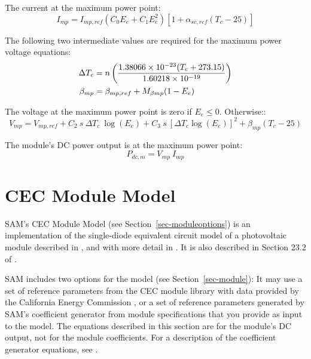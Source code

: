 \documentclass[12pt,letterpaper]{article}
\begin{document}
The current at the maximum power point:
\begin{equation}
I_{mp} = I_{mp,ref} (C_0 E_e + C_1 E_e^2) \left[1 + \alpha_{sc,ref} (T_c - 25)\right]
\end{equation}

The following two intermediate values are required for the maximum power voltage equations:
\begin{align}
\Delta T_c &= n \left(\frac{1.38066\times10^{-23} (T_c + 273.15)}{1.60218\times10^{-19}}\right) \notag\\
\beta_{mp} & = \beta_{mp,ref} + M_{\beta mp} (1 - E_e)
\end{align}


The voltage at the maximum power point is zero if $E_e \leq 0$. Otherwise::
\begin{equation}
V_{mp} = V_{mp,ref} +
 C_2~s~\Delta T_c~\log(E_e) +
 C_3~s~\left[\Delta T_c \log(E_e)\right]^2 +
 \beta_{mp} (T_c - 25)
\end{equation}

The module's DC power output is at the maximum power point:
\begin{equation}
P_{dc,m} = V_{mp}~I_{mp}
\end{equation}

\section{CEC Module Model}\label{sec-cecmodule}

SAM's CEC Module Model  (see Section~\ref{sec-moduleoptions}) is an implementation of the single-diode equivalent circuit model of a photovoltaic module described in \citet{desoto2004a}, and with more detail in \citet{desoto2004b}. It is also described in Section 23.2 of  \citet{duffie2013}.

SAM includes two options for the model (see Section~\ref{sec-module}): It may use a set of reference parameters from the CEC module library with data provided by the California Energy Commission \citep{gsc2014a}, or a set of reference parameters generated by SAM's coefficient generator from module specifications that you provide as input to the model. The equations described in this section are for the module's DC output, not for the module coefficients. For a description of the coefficient generator equations, see \citet{dobos2012a}. 
\end{document}
